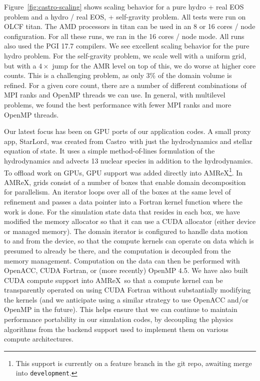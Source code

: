 \documentclass[a4paper]{jpconf}
\newcommand{\castro}{{\sffamily Castro}}
\newcommand{\starlord}{{\sffamily StarLord}}
\newcommand{\amrex}{{\sffamily AMReX}}
\newcommand{\MarginPar}[1]{\marginpar{\vskip-\baselineskip\raggedright\tiny\sffamily\hrule\smallskip{\color{red}#1}\par\smallskip\hrule}}
\begin{document}
Figure~\ref{fig:castro-scaling} shows scaling behavior for a pure
hydro + real EOS problem and a hydro / real EOS, + self-gravity
problem.  All tests were run on OLCF titan.  The AMD processors in
titan can be used in an 8 or 16 cores / node configuration.  For all
these runs, we ran in the 16 cores / node mode.  All runs also used
the PGI 17.7 compilers.  We see excellent scaling behavior for the
pure hydro problem.  For the self-gravity problem, we scale well with
a uniform grid, but with a $4\times$ jump for the AMR level on top of
this, we do worse at higher core counts.  This is a challenging
problem, as only 3\% of the domain volume is refined.  For a given
core count, there are a number of different combinations of MPI ranks
and OpenMP threads we can use.  In general, with multilevel problems,
we found the best performance with fewer MPI ranks and more OpenMP
threads.

Our latest focus has been on GPU ports of our application codes.  A
small proxy app, \starlord, was created from \castro\ with just the
hydrodynamics and stellar equation of state.  It uses a simple
method-of-lines formulation of the hydrodynamics and advects 13
nuclear species in addition to the hydrodynamics.  To offload work on
GPUs, GPU support was added directly into \amrex\footnote{This support
  is currently on a feature branch in the git repo, awaiting merge
  into {\tt development}.}.  In \amrex, grids consist of a number of
boxes that enable domain decomposition for parallelism.  An iterator
loops over all of the boxes at the same level of refinement and passes
a data pointer into a Fortran kernel function where the work is
done. For the simulation state data that resides in each box, we have
modified the memory allocator so that it can use a CUDA allocator
(either device or managed memory).  The domain iterator is configured
to handle data motion to and from the device, so that the compute
kernels can operate on data which is presumed to already be there, and
the computation is decoupled from the memory management. Computation
on the data can then be performed with OpenACC, CUDA Fortran, or (more
recently) OpenMP 4.5. We have also built CUDA compute support into
\amrex\ so that a compute kernel can be transparently operated on
using CUDA Fortran without substantially modifying the kernels (and we
anticipate using a similar strategy to use OpenACC and/or OpenMP in
the future). This helps ensure that we can continue to maintain
performance portability in our simulation codes, by decoupling the
physics algorithms from the backend support used to implement them on
various compute architectures.\MarginPar{add CPU time for reference}
\end{document}
